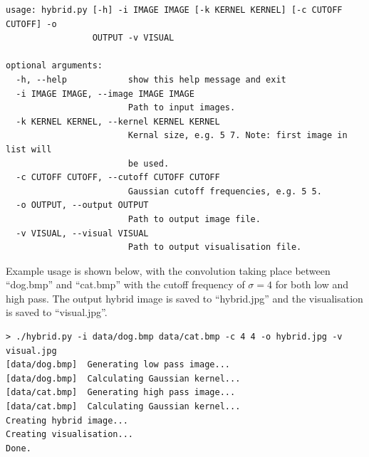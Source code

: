 \documentclass[a4paper]{article}
\begin{document}
\begin{verbatim}
usage: hybrid.py [-h] -i IMAGE IMAGE [-k KERNEL KERNEL] [-c CUTOFF CUTOFF] -o
                 OUTPUT -v VISUAL

optional arguments:
  -h, --help            show this help message and exit
  -i IMAGE IMAGE, --image IMAGE IMAGE
                        Path to input images.
  -k KERNEL KERNEL, --kernel KERNEL KERNEL
                        Kernal size, e.g. 5 7. Note: first image in list will
                        be used.
  -c CUTOFF CUTOFF, --cutoff CUTOFF CUTOFF
                        Gaussian cutoff frequencies, e.g. 5 5.
  -o OUTPUT, --output OUTPUT
                        Path to output image file.
  -v VISUAL, --visual VISUAL
                        Path to output visualisation file.    
\end{verbatim}

Example usage is shown below, with the convolution taking place between ``dog.bmp'' and ``cat.bmp'' with the cutoff frequency of $\sigma=4$ for both low and high pass. The output hybrid image is saved to ``hybrid.jpg'' and the visualisation is saved to ``visual.jpg''.
\begin{verbatim}
> ./hybrid.py -i data/dog.bmp data/cat.bmp -c 4 4 -o hybrid.jpg -v visual.jpg
[data/dog.bmp]	Generating low pass image...
[data/dog.bmp]	Calculating Gaussian kernel...
[data/cat.bmp]	Generating high pass image...
[data/cat.bmp]	Calculating Gaussian kernel...
Creating hybrid image...
Creating visualisation...
Done.   
\end{verbatim}
\end{document}
